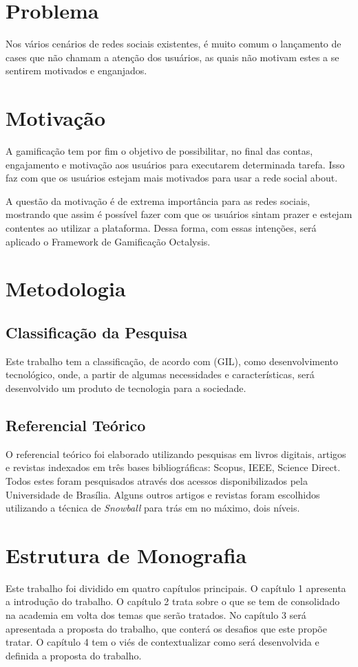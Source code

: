 \section{Problema}
Nos vários cenários de redes sociais existentes, é muito comum o lançamento de cases
que não chamam a atenção dos usuários, as quais não motivam estes a se sentirem
motivados e enganjados.
\section{Motivação}
A gamificação tem por fim o objetivo de 
possibilitar, no final das contas, engajamento e motivação aos usuários para
executarem determinada tarefa. Isso faz com que os usuários estejam mais
motivados para usar a rede social about. 

A questão da motivação é de extrema importância para as redes sociais, mostrando
que assim é possível fazer com que os usuários sintam prazer e estejam
contentes ao utilizar a plataforma. Dessa forma, com essas intenções,
será aplicado o Framework de Gamificação Octalysis.

\section{Metodologia}
\subsection{Classificação da Pesquisa}
\label{sub:classifica_o_da_pesquisa}
Este trabalho tem a classificação, de acordo com (GIL), como desenvolvimento tecnológico,
onde, a partir de algumas necessidades e características, será desenvolvido um produto
de tecnologia para a sociedade.

\subsection{Referencial Teórico}
\label{sub:referencial_te_rico}
O referencial teórico foi elaborado utilizando pesquisas em livros digitais, artigos e
revistas indexados em três bases bibliográficas: Scopus, IEEE, Science Direct. Todos estes
foram pesquisados através dos acessos disponibilizados pela Universidade de Brasília.
Alguns outros artigos e revistas foram escolhidos utilizando a técnica de
\textit{Snowball} para trás em no máximo, dois níveis.


\section{Estrutura de Monografia}
Este trabalho foi dividido em quatro capítulos principais. O capítulo 1 apresenta a introdução
do trabalho. O capítulo 2 trata sobre o que se tem de consolidado na academia em volta
dos temas que serão tratados. No capítulo 3 será apresentada a proposta do trabalho, que conterá
os desafios que este propõe tratar. O capítulo 4 tem o viés de contextualizar como será
desenvolvida e definida a proposta do trabalho.
